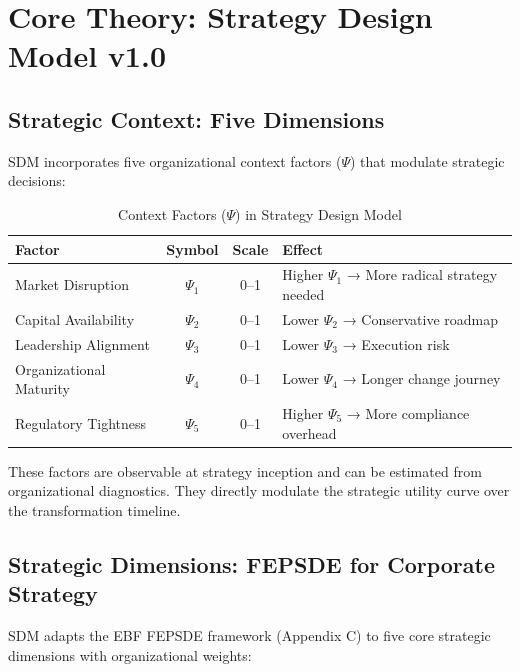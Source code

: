 \section{Core Theory: Strategy Design Model v1.0}
\label{sec:sdm-theory}

\subsection{Strategic Context: Five Dimensions}
\label{subsec:sdm-context}

SDM incorporates five organizational context factors ($\Psi$) that modulate strategic decisions:

\begin{table}[htbp]
\centering
\caption{Context Factors ($\Psi$) in Strategy Design Model}
\label{tab:sdm-context}
\renewcommand{\arraystretch}{1.4}
\begin{tabular}{@{}lccp{5cm}@{}}
\toprule
\textbf{Factor} & \textbf{Symbol} & \textbf{Scale} & \textbf{Effect} \\
\midrule
Market Disruption & $\Psi_1$ & 0--1 & Higher $\Psi_1$ → More radical strategy needed \\
Capital Availability & $\Psi_2$ & 0--1 & Lower $\Psi_2$ → Conservative roadmap \\
Leadership Alignment & $\Psi_3$ & 0--1 & Lower $\Psi_3$ → Execution risk \\
Organizational Maturity & $\Psi_4$ & 0--1 & Lower $\Psi_4$ → Longer change journey \\
Regulatory Tightness & $\Psi_5$ & 0--1 & Higher $\Psi_5$ → More compliance overhead \\
\bottomrule
\end{tabular}
\end{table}

These factors are observable at strategy inception and can be estimated from organizational diagnostics. They directly modulate the strategic utility curve over the transformation timeline.

\subsection{Strategic Dimensions: FEPSDE for Corporate Strategy}
\label{subsec:sdm-dimensions}

SDM adapts the EBF FEPSDE framework (Appendix C) to five core strategic dimensions with organizational weights:

